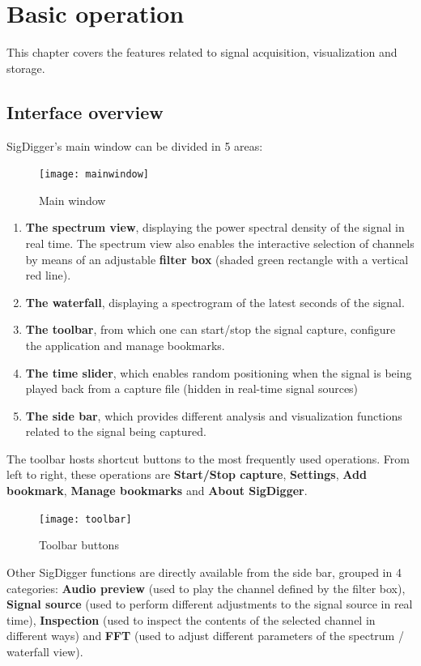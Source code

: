 \documentclass{ol-softwaremanual}
\begin{document}
\chapter{Basic operation}
This chapter covers the features related to signal acquisition, visualization and storage. 
\section{Interface overview}
SigDigger's main window can be divided in 5 areas:
\begin{figure}[!ht]
    \centering
    \texttt{[image: mainwindow]}
    \caption{Main window}
    \label{fig:mainwindow}
\end{figure}
\begin{enumerate}
    \item \textbf{The spectrum view}, displaying the power spectral density of the signal in real time. The spectrum view also enables the interactive selection of channels by means of an adjustable \textbf{filter box} (shaded green rectangle with a vertical red line). 
    \item \textbf{The waterfall}, displaying a spectrogram of the latest seconds of the signal.
    \item \textbf{The toolbar}, from which one can start/stop the signal capture, configure the application and manage bookmarks.
    \item \textbf{The time slider}, which enables random positioning when the signal is being played back from a capture file (hidden in real-time signal sources)
    \item \textbf{The side bar}, which provides different analysis and visualization functions related to the signal being captured.
\end{enumerate}

The toolbar hosts shortcut buttons to the most frequently used operations. From left to right, these operations are \textbf{Start/Stop capture}, \textbf{Settings}, \textbf{Add bookmark}, \textbf{Manage bookmarks} and \textbf{About SigDigger}.

\begin{figure}[!ht]
    \centering
    \texttt{[image: toolbar]}
    \caption{Toolbar buttons}
    \label{fig:toolbar}
\end{figure}

Other SigDigger functions are directly available from the side bar, grouped in 4 categories: \textbf{Audio preview} (used to play the channel defined by the filter box), \textbf{Signal source} (used to perform different adjustments to the signal source in real time), \textbf{Inspection} (used to inspect the contents of the selected channel in different ways) and \textbf{FFT} (used to adjust different parameters of the spectrum / waterfall view). 
\end{document}
